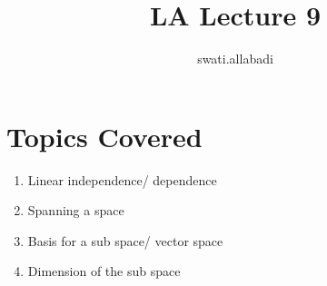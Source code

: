 \documentclass{article}
\title{LA Lecture 9}
\author{swati.allabadi }
\date{}
\begin{document}
\maketitle

\section{Topics Covered}
\begin{enumerate}
    \item Linear independence/ dependence
    \item Spanning a space
    \item Basis for a sub space/ vector space
    \item Dimension of the sub space
    
\end{enumerate}
\end{document}
